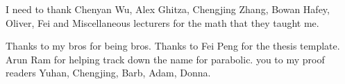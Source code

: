 I need to thank Chenyan Wu,  Alex Ghitza,  Chengjing Zhang, Bowan Hafey, Oliver, Fei and Miscellaneous lecturers
for the math that they taught me. 

Thanks to my bros for being bros. Thanks to Fei Peng for the thesis template. Arun Ram for helping track down the name for parabolic.  you to my proof readers Yuhan, Chengjing, Barb, Adam, Donna.
